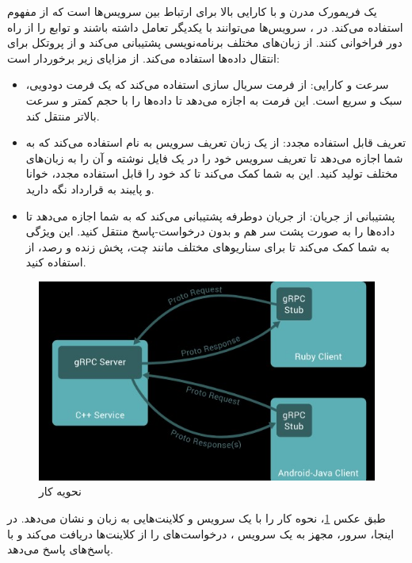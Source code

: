  یک فریمورک مدرن و با کارایی بالا برای ارتباط بین سرویس‌ها است که از مفهوم  استفاده می‌کند. در ، سرویس‌ها می‌توانند با یکدیگر \cite{10.1145/155870.155881}تعامل داشته باشند و توابع را از راه دور فراخوانی کنند.  از زبان‌های مختلف برنامه‌نویسی پشتیبانی می‌کند و از پروتکل  برای انتقال داده‌ها استفاده می‌کند.  از مزایای زیر برخوردار است:
\begin{itemize}
  \item 
   سرعت و کارایی:  از فرمت سریال سازی  استفاده می‌کند که یک فرمت دودویی، سبک و سریع است. این فرمت به  اجازه می‌دهد تا داده‌ها را با حجم کمتر و سرعت بالاتر منتقل کند.
   \item 
   تعریف قابل استفاده مجدد:  از یک زبان تعریف سرویس  به نام  استفاده می‌کند که به شما اجازه می‌دهد تا تعریف سرویس خود را در یک فایل نوشته و آن را به زبان‌های مختلف تولید کنید. این به شما کمک می‌کند تا کد خود را قابل استفاده مجدد، خوانا و پایبند به قرارداد نگه دارید.
   \item 
   پشتیبانی از جریان:  از جریان دوطرفه پشتیبانی می‌کند که به شما اجازه می‌دهد تا داده‌ها را به صورت پشت سر هم و بدون درخواست-پاسخ منتقل کنید. این ویژگی به شما کمک می‌کند تا برای سناریوهای مختلف مانند چت، پخش زنده و رصد، از  استفاده کنید.
\end{itemize}
\begin{figure}[!htb]
  \centering
  \includegraphics[scale=1]{Figures/6qt1vehe.jpg}
  \caption{نحویه کار }
  \label{Fig:grpc}
  \end{figure}

  
طبق عکس \ref{Fig:grpc}، نحوه کار  را با یک سرویس  و کلاینت‌هایی به زبان  و  نشان می‌دهد. در اینجا،  سرور، مجهز به یک سرویس ، درخواست‌های  را از کلاینت‌ها دریافت می‌کند و با پاسخ‌های  پاسخ می‌دهد.

